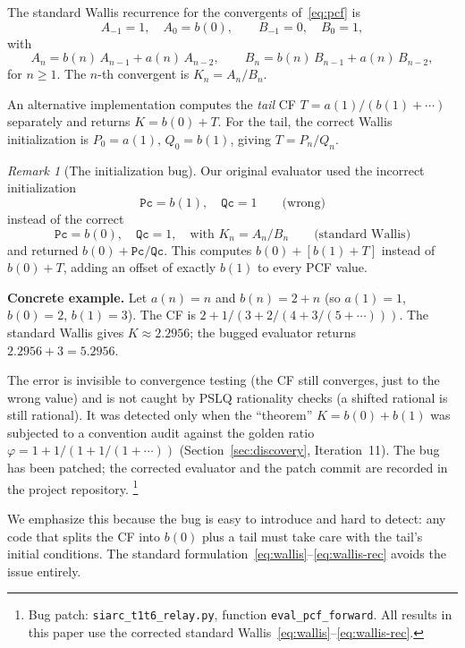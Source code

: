 \documentclass[11pt]{amsart}
\theoremstyle{definition}
\theoremstyle{remark}
\newtheorem{remark}[theorem]{Remark}
\begin{document}
The standard Wallis recurrence for the convergents of~\eqref{eq:pcf} is
\begin{equation}\label{eq:wallis}
  A_{-1}=1,\quad A_0 = b(0),\qquad
  B_{-1}=0,\quad B_0 = 1,
\end{equation}
with
\begin{equation}\label{eq:wallis-rec}
  A_n = b(n)\,A_{n-1} + a(n)\,A_{n-2},\qquad
  B_n = b(n)\,B_{n-1} + a(n)\,B_{n-2},
\end{equation}
for $n\ge 1$.  The $n$-th convergent is $K_n = A_n/B_n$.

An alternative implementation computes the
\emph{tail} CF $T = a(1)/(b(1)+\cdots)$ separately and returns
$K = b(0) + T$.  For the tail, the correct Wallis initialization is
$P_0 = a(1),\, Q_0 = b(1)$, giving $T = P_n/Q_n$.

\begin{remark}[The initialization bug]\label{rem:bug}
  Our original evaluator used the incorrect initialization
  \[
    \texttt{Pc} = b(1),\quad \texttt{Qc} = 1
    \qquad\text{(wrong)}
  \]
  instead of the correct
  \[
    \texttt{Pc} = b(0),\quad \texttt{Qc} = 1,\quad
    \text{with } K_n = A_n/B_n
    \qquad\text{(standard Wallis)}
  \]
  and returned $b(0) + \texttt{Pc}/\texttt{Qc}$.
  This computes $b(0) + [b(1) + T]$ instead of $b(0) + T$, adding
  an offset of exactly $b(1)$ to every PCF value.

  \smallskip\noindent\textbf{Concrete example.}
  Let $a(n) = n$ and $b(n) = 2+n$ (so $a(1)=1$, $b(0)=2$, $b(1)=3$).
  The CF is $2 + 1/(3 + 2/(4 + 3/(5+\cdots)))$.
  The standard Wallis gives $K \approx 2.2956$;
  the bugged evaluator returns $2.2956 + 3 = 5.2956$.

  \smallskip
  The error is invisible to convergence testing
  (the CF still converges, just to the wrong value) and is not
  caught by PSLQ rationality checks (a shifted rational is still
  rational).  It was detected only when the ``theorem''
  $K = b(0)+b(1)$ was subjected to a convention audit against
  the golden ratio $\varphi = 1+1/(1+1/(1+\cdots))$
  (Section~\ref{sec:discovery}, Iteration~11).
  The bug has been patched; the corrected evaluator and the
  patch commit are recorded in the project repository.%
  \footnote{Bug patch: \texttt{siarc\_t1t6\_relay.py}, function
    \texttt{eval\_pcf\_forward}. All results in this paper use
    the corrected standard Wallis~\eqref{eq:wallis}--\eqref{eq:wallis-rec}.}
\end{remark}

We emphasize this because the bug is easy to introduce and hard
to detect: any code that splits the CF into $b(0)$ plus a tail
must take care with the tail's initial conditions.
The standard formulation~\eqref{eq:wallis}--\eqref{eq:wallis-rec}
avoids the issue entirely.
\end{document}
